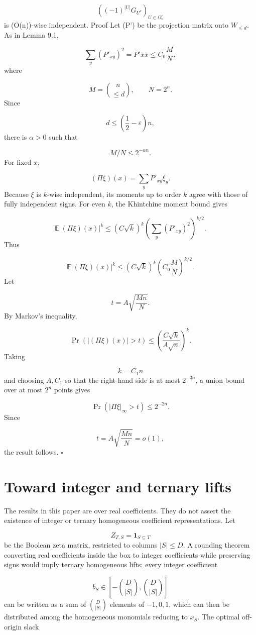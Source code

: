 \documentclass[11pt]{article}
\theoremstyle{definition}
\begin{document}
\[
\left((-1)^{|U|}G_{U^c}\right)_{U\in\Omega_n^\circ}
\]
is (O(n))-wise independent. Proof Let (P') be the projection matrix onto $W_{\le d}$. As in Lemma 9.1,

\[
\sum_y(P'_{xy})^2=P'{xx}\le C_0\frac{M}{N},
\]
where

\[
M=\binom{n}{\le d},
\qquad
N=2^n.
\]
Since

\[
d\le\left(\frac12-\varepsilon\right)n,
\]
there is $\alpha>0$ such that

\[
M/N\le2^{-\alpha n}.
\]
For fixed $x$,

\[
(\Pi\xi)(x)=\sum_yP'_{xy}\xi_y.
\]
Because $\xi$ is $k$-wise independent, its moments up to order $k$ agree with those of fully independent signs. For even $k$, the Khintchine moment bound gives

\[
\mathbb{E}|(\Pi\xi)(x)|^k
\le
(C\sqrt{k})^k
\left(\sum_y(P'_{xy})^2\right)^{k/2}.
\]
Thus

\[
\mathbb{E}|(\Pi\xi)(x)|^k
\le
(C\sqrt{k})^k
\left(C_0\frac{M}{N}\right)^{k/2}.
\]
Let

\[
t=A\sqrt{\frac{Mn}{N}}.
\]
By Markov's inequality,

\[
\Pr(|(\Pi\xi)(x)|>t)
\le
\left(\frac{C\sqrt{k}}{A\sqrt n}\right)^k.
\]
Taking

\[
k=C_1n
\]
and choosing $A,C_1$ so that the right-hand side is at most $2^{-3n}$, a union bound over at most $2^n$ points gives

\[
\Pr(|\Pi\xi|_\infty>t)\le2^{-2n}.
\]
Since

\[
t=A\sqrt{\frac{Mn}{N}}=o(1),
\]
the result follows. $\square$

\section{Toward integer and ternary lifts}
The results in this paper are over real coefficients. They do not assert the existence of integer or ternary homogeneous coefficient representations. Let

\[
Z_{T,S}=\mathbf 1_{S\subseteq T}
\]
be the Boolean zeta matrix, restricted to columns $|S|\le D$. A rounding theorem converting real coefficients inside the box to integer coefficients while preserving signs would imply ternary homogeneous lifts: every integer coefficient

\[
b_S\in[-\binom D{|S|},\binom D{|S|}]
\]
can be written as a sum of $\binom D{|S|}$ elements of ${-1,0,1}$, which can then be distributed among the homogeneous monomials reducing to $x_S$. The optimal off-origin slack
\end{document}
